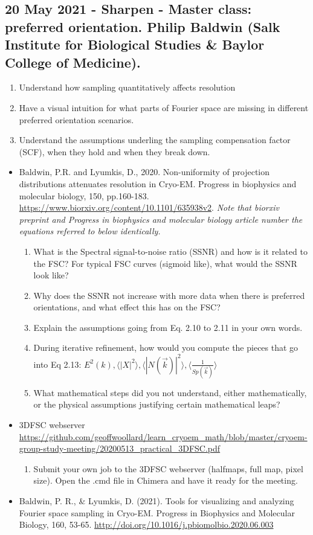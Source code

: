 \documentclass[11pt, oneside]{article}   	%
\begin{document}
\subsection{20 May 2021 - Sharpen - Master class: preferred orientation. Philip Baldwin (Salk Institute for Biological Studies \& Baylor College of Medicine).}
\begin{enumerate}
	\item Understand how sampling quantitatively affects resolution
	\item Have a visual intuition for what parts of Fourier space are missing in different preferred orientation scenarios.
	\item Understand the assumptions underling the sampling compensation factor (SCF), when they hold and when they break down.
\end{enumerate}
\begin{itemize}
	\item Baldwin, P.R. and Lyumkis, D., 2020. Non-uniformity of projection distributions attenuates resolution
in Cryo-EM. Progress in biophysics and molecular biology, 150, pp.160-183. \url{https://www.biorxiv.org/content/10.1101/635938v2}. 
{\it Note that biorxiv preprint and Progress in biophysics and molecular biology article number the equations referred to below identically.}
	\begin{enumerate}
		\item What is the Spectral signal-to-noise ratio (SSNR) and how is it related to the FSC? For typical FSC curves (sigmoid like), what would the SSNR look like? 
		\item Why does the SSNR not increase with more data when there is preferred orientations, and what effect this has on the FSC?
		\item Explain the assumptions going from Eq. 2.10 to 2.11 in your own words.
		\item During iterative refinement, how would you compute the pieces that go into Eq 2.13: $E^2(k),  \langle|X|^2\rangle, \langle|N(\vec k)|^2\rangle, \langle \frac{1}{Sp(\vec k)}\rangle$
		\item What mathematical steps did you not understand, either mathematically, or the physical assumptions justifying certain mathematical leaps?
	\end{enumerate}
	\item 3DFSC webserver \url{https://github.com/geoffwoollard/learn_cryoem_math/blob/master/cryoem-group-study-meeting/20200513_practical_3DFSC.pdf}
	\begin{enumerate}
		\item Submit your own job to the 3DFSC webserver (halfmaps, full map, pixel size). Open the .cmd file in Chimera and have it ready for the meeting.
	\end{enumerate}
	\item Baldwin, P. R., \& Lyumkis, D. (2021). Tools for visualizing and analyzing Fourier space sampling in Cryo-EM. Progress in Biophysics and Molecular Biology, 160, 53-65. \url{http://doi.org/10.1016/j.pbiomolbio.2020.06.003}
\end{itemize}
\end{document}
